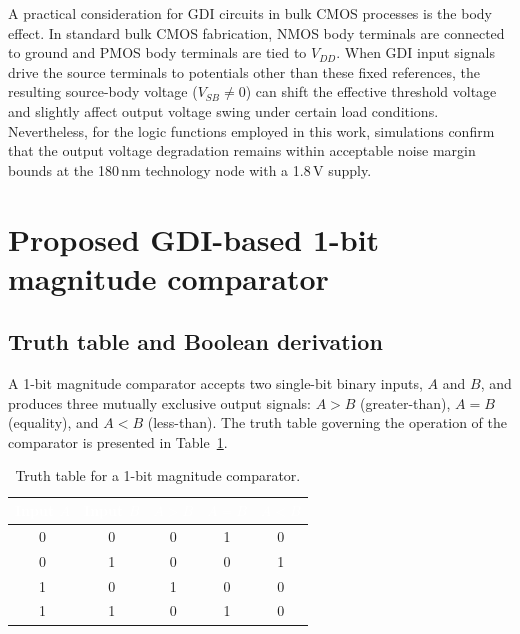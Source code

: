 \documentclass[final,5p,times,twocolumn]{elsarticle}
\begin{document}
A practical consideration for GDI circuits in bulk CMOS processes is the body effect. In standard bulk CMOS fabrication, NMOS body terminals are connected to ground and PMOS body terminals are tied to $V_{DD}$. When GDI input signals drive the source terminals to potentials other than these fixed references, the resulting source-body voltage ($V_{SB} \neq 0$) can shift the effective threshold voltage and slightly affect output voltage swing under certain load conditions. Nevertheless, for the logic functions employed in this work, simulations confirm that the output voltage degradation remains within acceptable noise margin bounds at the 180\,nm technology node with a 1.8\,V supply.


\section{Proposed GDI-based 1-bit magnitude comparator}
\label{sec:proposed_design}

\subsection{Truth table and Boolean derivation}

A 1-bit magnitude comparator accepts two single-bit binary inputs, $A$ and $B$, and produces three mutually exclusive output signals: $A>B$ (greater-than), $A=B$ (equality), and $A<B$ (less-than). The truth table governing the operation of the comparator is presented in Table~\ref{tab:truth_table}.

\begin{table}[t]
    \centering
    \caption{Truth table for a 1-bit magnitude comparator.}
    \label{tab:truth_table}
    \renewcommand{\arraystretch}{1.35}
    \setlength{\tabcolsep}{12pt}
    {\small
    \begin{tabular}{|c|c|c|c|c|}
        \hline
        \rowcolor{worddarkblue}
        \textcolor{white}{\textbf{Input $A$}} & \textcolor{white}{\textbf{Input $B$}} & \textcolor{white}{\textbf{$A>B$}} & \textcolor{white}{\textbf{$A=B$}} & \textcolor{white}{\textbf{$A<B$}} \\
        \hline
        0 & 0 & 0 & 1 & 0 \\
        \hline
        \rowcolor{wordzebra}
        0 & 1 & 0 & 0 & 1 \\
        \hline
        1 & 0 & 1 & 0 & 0 \\
        \hline
        \rowcolor{wordzebra}
        1 & 1 & 0 & 1 & 0 \\
        \hline
    \end{tabular}
    }
\end{table}
\end{document}
